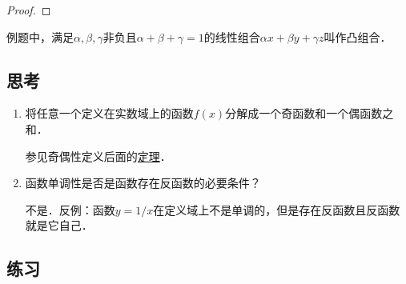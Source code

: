 \begin{example*}
\begin{proof}
  \end{proof}
  \begin{remark}
    例题中，满足\(\alpha, \beta, \gamma\)非负且\(\alpha + \beta + \gamma = 1\)的线性组合\(\alpha x + \beta y + \gamma z\)叫作凸组合\cite{ConvexCombWiki}．
  \end{remark}
\end{example*}

\subsection*{思考}

\begin{enumerate}
\item 将任意一个定义在实数域上的函数\(f(x)\)分解成一个奇函数和一个偶函数之和．

  \ifshowsolp
  参见奇偶性定义后面的\hyperlink{T:evenodd}{定理}．
  \fi

\item 函数单调性是否是函数存在反函数的必要条件？

  \ifshowsolp
  不是．反例：函数\(y = 1/x\)在定义域上不是单调的，但是存在反函数且反函数就是它自己．
  \fi
\end{enumerate}

\ifshowex
{}
\subsection*{练习}

